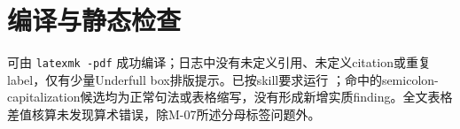 \documentclass[UTF8,a4paper,11pt]{ctexart}
\begin{document}
\section*{编译与静态检查}

 可由 \texttt{latexmk -pdf} 成功编译；日志中没有未定义引用、未定义citation或重复label，仅有少量Underfull box排版提示。已按skill要求运行 ；命中的semicolon-capitalization候选均为正常句法或表格缩写，没有形成新增实质finding。全文表格差值核算未发现算术错误，除M-07所述分母标签问题外。
\end{document}
